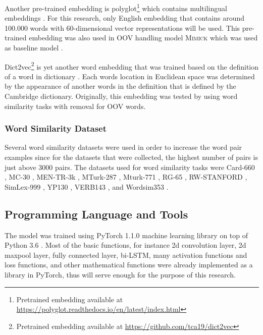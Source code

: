             Another pre-trained embedding is
            polyglot\footnote{Pretrained embedding available at
            \url{https://polyglot.readthedocs.io/en/latest/index.html}}
             which contains multilingual embeddings
            \citep{polyglot2013alrfou}. For this research, only
            English embedding that contains around 100.000 words with
            60-dimensional vector representations will be used. This
            pre-trained embedding was also used in OOV handling model
            \textsc{Mimick} which was used as baseline model
            \citep{mimicking2017Pinter}.

            Dict2vec\footnote{Pretrained embedding available at
            \url{https://github.com/tca19/dict2vec}} is yet another
            word embedding that was trained based on the definition of
            a word in dictionary \citep{dict2vect2017tissier}. Each
            words location in Euclidean space was determined by the
            appearance of another words in the definition that is
            defined by the Cambridge dictionary. Originally, this
            embedding was tested by using word similarity tasks with
            removal for OOV words.

        \subsubsection{Word Similarity Dataset}
            Several word similarity datasets were used in order to
            increase the word pair examples since for the datasets that were
            collected, the highest number of pairs is just above 3000
            pairs. The datasets used for word similarity tasks were
            Card-660 \citep{card660:pilehvar-etal:2018}, MC-30
            \citep{mc30:strongContextualHypothesis}, MEN-TR-3k
            \citep{mentr3k:bruni-etal-2012-distributional}, MTurk-287
            \citep{mturk287:Radinsky:2011:WTC:1963405.1963455},
            Mturk-771
            \citep{mturk771:Halawi:2012:LLW:2339530.2339751}, RG-65
            \citep{rg65:Rubenstein:1965:CCS:365628.365657},
            RW-STANFORD \citep{rw:luong-etal-2013-better}, SimLex-999
            \citep{simlex999:hill2014}, YP130
            \citep{yp130:inproceedings}, VERB143
            \citep{vp143:baker-etal-2014-unsupervised}, and Wordsim353
            \citep{wordsim353:2002:PSC:503104.503110}.

    \subsection{Programming Language and Tools}
        The model was trained using PyTorch 1.1.0 machine learning
        library on top of Python 3.6 \citep{pytorch2017paszke}. Most
        of the basic functions, for instance 2d convolution layer, 2d
        maxpool layer, fully connected layer, bi-LSTM, many
        activation functions and loss functions, and other mathematical
        functions were already implemented as a library in PyTorch,
        thus will serve enough for the purpose of this research.

